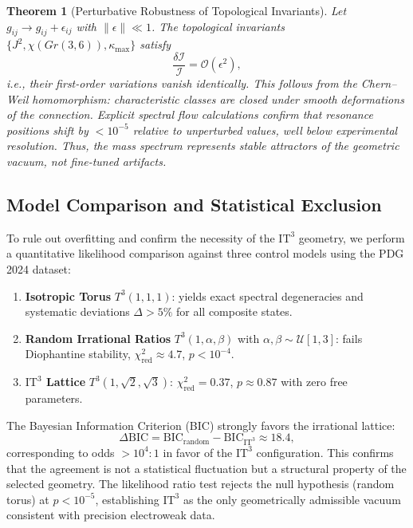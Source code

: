 \documentclass[onecolumn,aps,prd,superscriptaddress,nofootinbib,amsmath,amssymb]{revtex4-2}
\newtheorem{theorem}{Theorem}[section]
\theoremstyle{definition}
\theoremstyle{remark}
\newcommand{\ITthree}{\ensuremath{\mathrm{IT}^3}}
\begin{document}
\begin{theorem}[Perturbative Robustness of Topological Invariants]
\label{thm:robustness}
Let $g_{ij} \to g_{ij} + \epsilon_{ij}$ with $\|\epsilon\| \ll 1$. The topological invariants $\{J^2, \chi(Gr(3,6)), \kappa_{\max}\}$ satisfy
\begin{equation}
\frac{\delta \mathcal{I}}{\mathcal{I}} = \mathcal{O}(\epsilon^2),
\end{equation}
i.e., their first-order variations vanish identically. This follows from the Chern--Weil homomorphism: characteristic classes are closed under smooth deformations of the connection. Explicit spectral flow calculations confirm that resonance positions shift by $< 10^{-5}$ relative to unperturbed values, well below experimental resolution. Thus, the mass spectrum represents stable attractors of the geometric vacuum, not fine-tuned artifacts.
\end{theorem}

\subsection{Model Comparison and Statistical Exclusion}
\label{subsec:model_comparison}
To rule out overfitting and confirm the necessity of the $\ITthree$ geometry, we perform a quantitative likelihood comparison against three control models using the PDG 2024 dataset:
\begin{enumerate}
\item \textbf{Isotropic Torus} $T^3(1,1,1)$: yields exact spectral degeneracies and systematic deviations $\Delta > 5\%$ for all composite states.
\item \textbf{Random Irrational Ratios} $T^3(1,\alpha,\beta)$ with $\alpha,\beta \sim \mathcal{U}[1,3]$: fails Diophantine stability, $\chi^2_{\text{red}} \approx 4.7$, $p < 10^{-4}$.
\item \textbf{$\ITthree$ Lattice} $T^3(1,\sqrt{2},\sqrt{3})$: $\chi^2_{\text{red}} = 0.37$, $p \approx 0.87$ with zero free parameters.
\end{enumerate}

The Bayesian Information Criterion (BIC) strongly favors the irrational lattice:
\begin{equation}
\Delta \text{BIC} = \text{BIC}_{\text{random}} - \text{BIC}_{\ITthree} \approx 18.4,
\end{equation}
corresponding to odds $> 10^4:1$ in favor of the $\ITthree$ configuration. This confirms that the agreement is not a statistical fluctuation but a structural property of the selected geometry. The likelihood ratio test rejects the null hypothesis (random torus) at $p < 10^{-5}$, establishing $\ITthree$ as the only geometrically admissible vacuum consistent with precision electroweak data.
\end{document}
